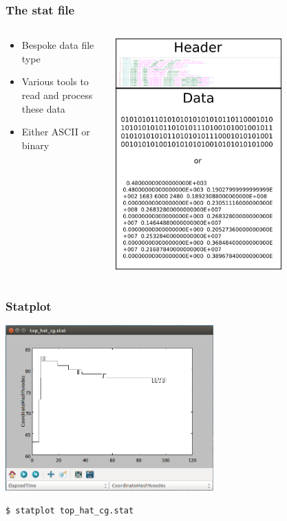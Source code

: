 \documentclass[12pt]{beamer}
\begin{document}
\begin{frame}
    \frametitle{The stat file}
\begin{columns}
\begin{column}{0.6\textwidth}
\begin{itemize}
\item Bespoke data file type
\item Various tools to read and process these data
\item Either ASCII or binary
\end{itemize}
\end{column}
\begin{column}{0.4\textwidth}
\begin{center}
\includegraphics[width=0.7\textwidth]{images/stat_file.png}
\end{center}
\end{column}
\end{columns}
\end{frame}

\begin{frame}
    \frametitle{Statplot}
\begin{center}
\includegraphics[width=0.6\textwidth]{images/statplot.png}\\
\end{center}
\texttt{\$ statplot top\_hat\_cg.stat}
\end{frame}
\end{document}
